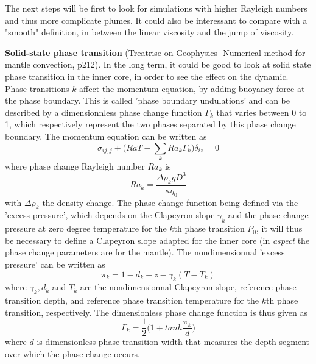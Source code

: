 \documentclass{article}
\begin{document}
The next steps will be first to look for simulations with higher Rayleigh numbers and thus more complicate plumes. It could also be interessant to compare with a "smooth" definition, in between the linear viscosity and the jump of viscosity. 

\textbf{Solid-state phase transition} (Treatrise on Geophysics -Numerical method for mantle convection, p212). In the long term, it could be good to look at solid state phase transition in the inner core, in order to see the effect on the dynamic. Phase transitions $k$ affect the momentum equation, by adding buoyancy force at the phase boundary. This is called 'phase boundary undulations' and can be described by a dimensionnless phase change function $\Gamma_k$ that varies between 0 to 1, which respectively represent the two phases separated by this phase change boundary. The momentum equation can be written as
 \begin{equation}
\sigma_{ij,j} + \Bigg(Ra T - \sum\limits_{k} Ra_k \Gamma_k\Bigg) \delta_{iz} = 0 
\end{equation}
where phase change Rayleigh number $Ra_k$ is
\begin{equation}
Ra_k= \frac{\Delta \rho_k g D^3}{\kappa \eta_0}
\end{equation}
with $\Delta \rho_k$ the density change.
The phase change function being defined via the 'excess pressure', which depends on the Clapeyron slope $\gamma_k$ and the phase change pressure at zero degree temperature for the $k$th phase transition $P_0$, it will thus be necessary to define a Clapeyron slope adapted for the inner core (in \textit{aspect} the phase change parameters are for the mantle). The nondimensionnal 'excess pressure' can be written as 
\begin{equation}
 \pi_k = 1 - d_k - z - \gamma_k (T - T_k)
\end{equation}
where $\gamma_k, d_k$ and $T_k$ are the nondimensionnal Clapeyron slope, reference phase transition depth, and reference phase transition temperature for the $k$th phase transition, respectively. The dimensionless phase change function is thus given as 
\begin{equation}
 \Gamma_k = \frac{1}{2} \Bigg(1 + tanh \frac{\pi_k}{d}\Bigg)
\end{equation}
where $d$ is dimensionless phase transition width that measures the depth segment over which the phase change occurs.  
\end{document}
